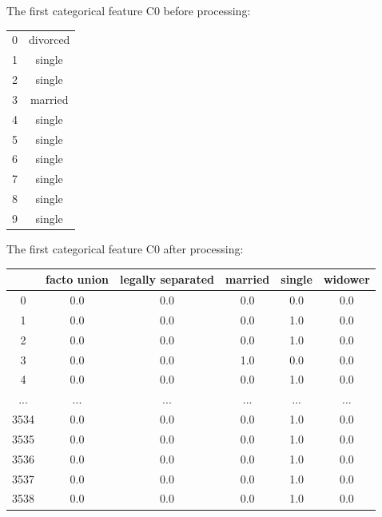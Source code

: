 \documentclass{article}
\begin{document}
\begin{description}
		The first categorical feature C0 before processing:

		\begin{center}
			\begin{tabular}{|c|c|}
				\hline
				0    &  divorced \\
				1    &  single \\
				2    &  single \\
				3    &  married \\
				4    &  single \\
				5    &  single \\
				6    &  single \\
				7    &  single \\
				8    &  single \\
				9    &  single \\
				\hline
			\end{tabular}
		\end{center}
		
		The first categorical feature C0 after processing:

		\begin{center}
			\begin{tabular}{|c|c|c|c|c|c|}
				\hline
				& facto union  & legally separated & married & single & widower \\
				\hline
				0               & 0.0                  & 0.0        &  0.0        & 0.0        & 0.0 \\
				1               & 0.0                  & 0.0        &  0.0        & 1.0        & 0.0 \\
				2               & 0.0                  & 0.0        &  0.0        & 1.0        & 0.0 \\
				3               & 0.0                  & 0.0        &  1.0        & 0.0        & 0.0 \\
				4               & 0.0                  & 0.0        &  0.0        & 1.0        & 0.0 \\
				...             & ...                  & ...        &  ...        & ...        & ... \\
				3534            & 0.0                  & 0.0        &  0.0        & 1.0        & 0.0 \\
				3535            & 0.0                  & 0.0        &  0.0        & 1.0        & 0.0 \\
				3536            & 0.0                  & 0.0        &  0.0        & 1.0        & 0.0 \\
				3537            & 0.0                  & 0.0        &  0.0        & 1.0        & 0.0 \\
				3538            & 0.0                  & 0.0        &  0.0        & 1.0        & 0.0 \\	
				\hline
			\end{tabular}
		\end{center}


\end{description}
\end{document}
